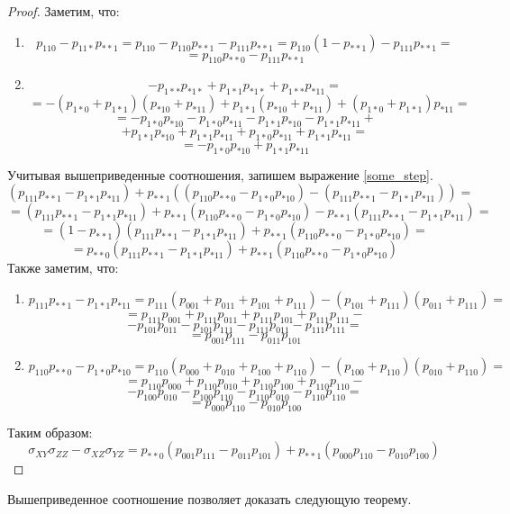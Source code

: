 \begin{proof}
    Заметим, что:
    \begin{enumerate}
        \item $$
        p_{110}-p_{11*}p_{**1}=p_{110}-p_{110}p_{**1}-p_{111}p_{**1}=
        p_{110}(1-p_{**1})-p_{111}p_{**1}=
    $$
    $$   
        =p_{110}p_{**0}-p_{111}p_{**1}
    $$
    \item
    $$
        -p_{1**}p_{*1*} + p_{1*1}p_{*1*} + p_{1**}p_{*11}=
    $$
    $$
        =-(p_{1*0}+p_{1*1})(p_{*10}+p_{*11})+p_{1*1}(p_{*10}+p_{*11}) + (p_{1*0}+p_{1*1})p_{*11}=
    $$
    $$
        =-p_{1*0}p_{*10}-p_{1*0}p_{*11}-p_{1*1}p_{*10}-p_{1*1}p_{*11}+$$
    $$
        +p_{1*1}p_{*10}+p_{1*1}p_{*11}+p_{1*0}p_{*11}+p_{1*1}p_{*11}=
    $$
    $$
        =-p_{1*0}p_{*10}+p_{1*1}p_{*11}
    $$
    \end{enumerate}
    Учитывая вышеприведенные соотношения, запишем выражение \eqref{some_step}.
    $$
    (p_{111}p_{**1}-p_{1*1}p_{*11})+p_{**1}((p_{110}p_{**0}-p_{1*0}p_{*10})-(p_{111}p_{**1}-p_{1*1}p_{*11}))=
    $$
    $$
        =(p_{111}p_{**1}-p_{1*1}p_{*11})+p_{**1}(p_{110}p_{**0}-p_{1*0}p_{*10})-p_{**1}(p_{111}p_{**1}-p_{1*1}p_{*11})=
    $$
    $$
        =(1-p_{**1})(p_{111}p_{**1}-p_{1*1}p_{*11})+p_{**1}(p_{110}p_{**0}-p_{1*0}p_{*10})=
    $$
    $$
        =p_{**0}(p_{111}p_{**1}-p_{1*1}p_{*11})+p_{**1}(p_{110}p_{**0}-p_{1*0}p_{*10})
    $$
    Также заметим, что:
    \begin{enumerate}
        \item
    $$
        p_{111}p_{**1}-p_{1*1}p_{*11} = p_{111}(p_{001}+p_{011}+p_{101}+p_{111})-
        (p_{101}+p_{111})(p_{011}+p_{111})=
    $$
    $$
        = p_{111}p_{001}+p_{111}p_{011}+p_{111}p_{101}+p_{111}p_{111} -
    $$
    $$
        - p_{101}p_{011}-p_{101}p_{111}-p_{111}p_{011}-p_{111}p_{111}=
    $$
    $$
        = p_{001}p_{111}-p_{011}p_{101}
    $$
    \item
    $$
        p_{110}p_{**0}-p_{1*0}p_{*10}=
        p_{110}(p_{000}+p_{010}+p_{100}+p_{110})-(p_{100}+p_{110})(p_{010}+p_{110})=
    $$
    $$
        =p_{110}p_{000}+p_{110}p_{010}+p_{110}p_{100}+p_{110}p_{110} -
    $$ $$
        -p_{100}p_{010}-p_{100}p_{110}-p_{110}p_{010}-p_{110}p_{110}=
    $$
    $$
        =p_{000}p_{110}-p_{010}p_{100}
    $$
    \end{enumerate}
    Таким образом:
    $$
    \sigma_{XY} \sigma_{ZZ} - \sigma_{XZ} \sigma_{YZ} = p_{**0}(p_{001}p_{111}-p_{011}p_{101}) + p_{**1} (p_{000}p_{110}-p_{010}p_{100})
    $$
\end{proof}
Вышеприведенное соотношение позволяет доказать следующую теорему.
